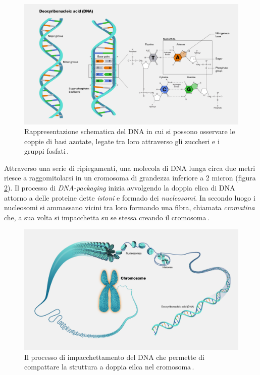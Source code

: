 \begin{figure}[b!]
    \centering
    \includegraphics[width=\textwidth]{assets/dna2.jpg}
    \caption[Rappresentazione schematica del DNA.]{Rappresentazione schematica del DNA in cui si possono osservare le coppie di basi azotate, legate tra loro attraverso gli zuccheri e i gruppi fosfati\,\cite{nhgri_dna_image}.}\label{fig:dna}
\end{figure}

Attraverso una serie di ripiegamenti, una molecola di DNA lunga circa due metri riesce a raggomitolarsi in un cromosoma di grandezza inferiore a 2 micron (figura\,\ref{fig:dna-packaging}). Il processo di \textit{DNA-packaging} inizia avvolgendo la doppia elica di DNA attorno a delle proteine dette \textsl{istoni} e formado dei \textsl{nucleosomi}. In secondo luogo i nucleosomi si ammassano vicini tra loro formando una fibra, chiamata \textsl{cromatina} che, a sua volta si impacchetta su se stessa creando il cromosoma\,\cite{jansen2011nucleosome, zheng2010packaging}.

\begin{figure}[b!]
    \centering
    \includegraphics[width=\textwidth]{assets/dna-packaging.jpg}
    \caption[Il processo di impacchettamento del DNA.]{Il processo di impacchettamento del DNA che permette di compattare la struttura a doppia eilca nel cromosoma\,\cite{nhgri_chromosome_image}.}\label{fig:dna-packaging}
\end{figure}

